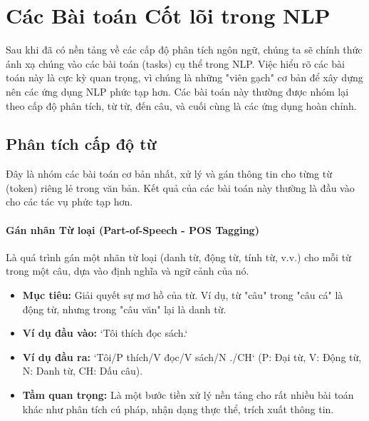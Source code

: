 
\section{Các Bài toán Cốt lõi trong NLP}
\label{sec:bai_toan_cot_loi}

Sau khi đã có nền tảng về các cấp độ phân tích ngôn ngữ, chúng ta sẽ chính thức ánh xạ chúng vào các bài toán (tasks) cụ thể trong NLP. Việc hiểu rõ các bài toán này là cực kỳ quan trọng, vì chúng là những "viên gạch" cơ bản để xây dựng nên các ứng dụng NLP phức tạp hơn. Các bài toán này thường được nhóm lại theo cấp độ phân tích, từ từ, đến câu, và cuối cùng là các ứng dụng hoàn chỉnh.

\subsection{Phân tích cấp độ từ}
\label{ssec:phan_tich_tu}

Đây là nhóm các bài toán cơ bản nhất, xử lý và gán thông tin cho từng từ (token) riêng lẻ trong văn bản. Kết quả của các bài toán này thường là đầu vào cho các tác vụ phức tạp hơn.

\paragraph{Gán nhãn Từ loại (Part-of-Speech - POS Tagging)}
Là quá trình gán một nhãn từ loại (danh từ, động từ, tính từ, v.v.) cho mỗi từ trong một câu, dựa vào định nghĩa và ngữ cảnh của nó.
\begin{itemize}
    \item \textbf{Mục tiêu:} Giải quyết sự mơ hồ của từ. Ví dụ, từ "câu" trong "câu cá" là động từ, nhưng trong "câu văn" lại là danh từ.
    \item \textbf{Ví dụ đầu vào:} `Tôi thích đọc sách.`
    \item \textbf{Ví dụ đầu ra:} `Tôi/P thích/V đọc/V sách/N ./CH` (P: Đại từ, V: Động từ, N: Danh từ, CH: Dấu câu).
    \item \textbf{Tầm quan trọng:} Là một bước tiền xử lý nền tảng cho rất nhiều bài toán khác như phân tích cú pháp, nhận dạng thực thể, trích xuất thông tin.
\end{itemize}

